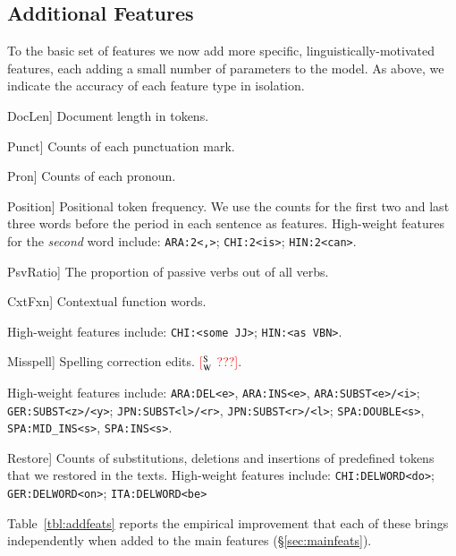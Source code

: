 \documentclass[11pt,letterpaper]{article}
\newcommand{\ensuretext}[1]{#1}
\newcommand{\swmarker}{\ensuretext{\textcolor{red}{\ensuremath{^{\textsc{S}}_{\textsc{W}}}}}}
\newcommand{\arkcomment}[3]{\ensuretext{\textcolor{#3}{[#1 #2]}}}
\newcommand{\sw}[1]{\arkcomment{\swmarker}{#1}{red}}
\newcommand{\Sref}[1]{\S\ref{#1}}
\newcommand{\Tref}[1]{Table~\ref{#1}}
\newcommand{\feat}[1]{\textsmaller[.5]{\textsf{#1}}} %
\begin{document}
\subsection{Additional Features}\label{sec:addfeats}
To the basic set of features we now add more specific,
linguistically-motivated features, each adding a small number of
parameters to the model.  As above, we indicate the accuracy of each
feature type in isolation.

\begin{compactdesc}
\item[\feat{DocLen}] Document length in tokens.
\item[\feat{Punct}] Counts of each punctuation mark. 
\item[\feat{Pron}] Counts of each pronoun.
\item[\feat{Position}] Positional token frequency. We use the counts
  for the first two and last three words before the period in each
  sentence as features. High-weight features for the \emph{second} word include: {\tt ARA:2<,>}; {\tt CHI:2<is>}; {\tt HIN:2<can>}.
\item[\feat{PsvRatio}] The proportion of passive verbs out of all
  verbs.
\item[\feat{CxtFxn}] Contextual function words. \raggedright High-weight features include: {\tt CHI:<some JJ>}; \mbox{\tt HIN:<as VBN>}. 
\item[\feat{Misspell}] Spelling correction edits. \sw{???}. \raggedright High-weight features include: {\tt ARA:DEL<e>}, {\tt ARA:INS<e>}, {\tt ARA:SUBST<e>/<i>}; {\tt GER:SUBST<z>/<y>}; {\tt JPN:SUBST<l>/<r>}, {\tt JPN:SUBST<r>/<l>}; {\tt SPA:DOUBLE<s>}, {\tt SPA:MID\_INS<s>}, {\tt SPA:INS<s>}.
\item[\feat{Restore}] Counts of substitutions, deletions and
  insertions of predefined tokens that we restored in the texts. High-weight features include: {\tt CHI:DELWORD<do>}; {\tt GER:DELWORD<on>}; {\tt ITA:DELWORD<be>}  
\end{compactdesc}
\noindent
\Tref{tbl:addfeats} reports the empirical improvement that each of
these brings independently when added to the main features
(\Sref{sec:mainfeats}).
\end{document}
